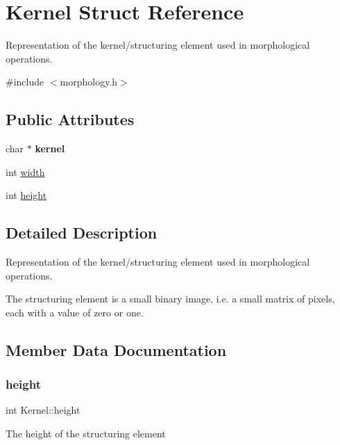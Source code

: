 \hypertarget{structKernel}{}\section{Kernel Struct Reference}
\label{structKernel}


Representation of the kernel/structuring element used in morphological operations.  




{\ttfamily \#include $<$morphology.\+h$>$}

\subsection*{Public Attributes}
\begin{DoxyCompactItemize}
\item 
\mbox{\label{structKernel_acbd09583b7a61ab199c7b8d2d55362fc}} 
char $\ast$ {\bfseries kernel}
\item 
int \hyperlink{structKernel_a053d2b56c8cf9bbb0f20fe54053d7281}{width}
\item 
int \hyperlink{structKernel_a8735bd2b1feac1cc92965ab72da9ba63}{height}
\end{DoxyCompactItemize}


\subsection{Detailed Description}
Representation of the kernel/structuring element used in morphological operations. 

The structuring element is a small binary image, i.\+e. a small matrix of pixels, each with a value of zero or one. 

\subsection{Member Data Documentation}
\mbox{\label{structKernel_a8735bd2b1feac1cc92965ab72da9ba63}} 
\subsubsection{\texorpdfstring{height}{height}}
{\footnotesize\ttfamily int Kernel\+::height}

The height of the structuring element \mbox{\label{structKernel_a053d2b56c8cf9bbb0f20fe54053d7281}} 
